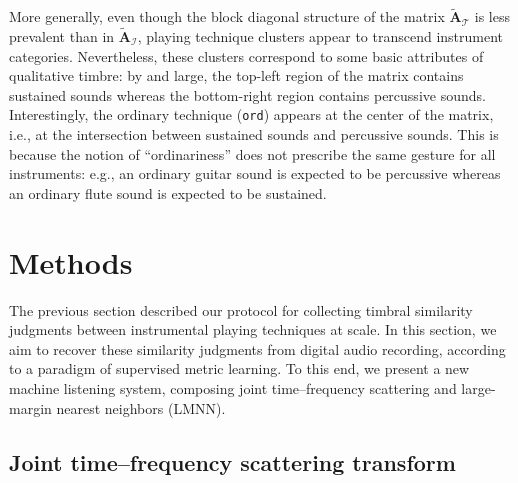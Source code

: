 \documentclass{bmcart}
\makeatletter
\newcommand*{\eg}{e.g.,\@\xspace}
\newcommand*{\ie}{i.e.,\@\xspace}
\newcommand{\nmu}{}
\makeatother
\begin{document}
More generally, even though the block diagonal structure of the matrix $\widetilde{\mathbf{A}}_{\mathcal{T}}$ is less prevalent than in $\widetilde{\mathbf{A}}_{\mathcal{I}}$, playing technique clusters appear to transcend instrument categories.
Nevertheless, these clusters correspond to some basic attributes of qualitative timbre: by and large, the top-left region of the matrix contains sustained sounds whereas the bottom-right region contains percussive sounds.
Interestingly, the ordinary technique (\texttt{ord}) appears at the center of the matrix, \ie{} at the intersection between sustained sounds and percussive sounds.
This is because the notion of ``ordinariness'' does not prescribe the same gesture for all instruments: \eg{} an ordinary guitar sound is expected to be percussive whereas an ordinary flute sound is expected to be sustained.

\section*{\nmu Methods}
\label{sec:methods}
The previous section described our protocol for collecting timbral similarity judgments between instrumental playing techniques at scale.
In this section, we aim to recover these similarity judgments from digital audio recording, according to a paradigm of supervised metric learning.
To this end, we present a new machine listening system, composing joint time--frequency scattering and large-margin nearest neighbors (LMNN).



\subsection*{Joint time--frequency scattering transform}
\label{sec:scattering}

\end{document}
